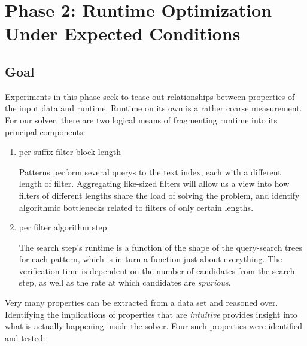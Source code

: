\section{Phase 2: Runtime Optimization Under Expected Conditions}
\label{phase2}

\subsection{Goal}
Experiments in this phase seek to tease out relationships between properties of the input data and runtime. Runtime on its own is a rather coarse measurement. For our \aspop{} solver, there are two logical means of fragmenting runtime into its principal components:

\begin{enumerate}
\item per \gls{suffix filter} block length

Patterns perform several \glspl{query} to the \gls{text index}, each with a different length of \gls{filter}. Aggregating like-sized filters will allow us a view into how filters of different lengths share the load of solving the problem, and identify algorithmic bottlenecks related to filters of only certain lengths.

\item per \gls{filter algorithm} step

The \gls{search step}'s runtime is a function of the shape of the query-search trees for each \gls{pattern}, which is in turn a function just about everything. The verification time is dependent on the number of \glspl{candidate} from the search step, as well as the rate at which candidates are \textit{spurious}.
\end{enumerate}

Very many properties can be extracted from a data set and reasoned over. Identifying the implications of properties that are \textit{intuitive} provides insight into what is actually happening inside the solver. Four such properties were identified and tested:

